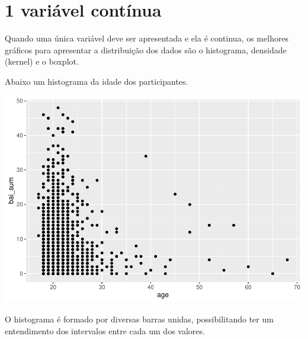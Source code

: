 \documentclass[
]{book}
\newenvironment{Shaded}{\begin{snugshade}}{\end{snugshade}}
\newcommand{\DataTypeTok}[1]{\textcolor[rgb]{0.13,0.29,0.53}{#1}}
\newcommand{\DecValTok}[1]{\textcolor[rgb]{0.00,0.00,0.81}{#1}}
\newcommand{\KeywordTok}[1]{\textcolor[rgb]{0.13,0.29,0.53}{\textbf{#1}}}
\newcommand{\NormalTok}[1]{#1}
\newcommand{\OperatorTok}[1]{\textcolor[rgb]{0.81,0.36,0.00}{\textbf{#1}}}
\newcommand{\StringTok}[1]{\textcolor[rgb]{0.31,0.60,0.02}{#1}}
\begin{document}
\hypertarget{variuxe1vel-contuxednua}{%
\section{1 variável contínua}\label{variuxe1vel-contuxednua}}

Quando uma única variável deve ser apresentada e ela é continua, os
melhores gráficos para apresentar a distribuição dos dados são o
histograma, densidade (kernel) e o boxplot.

Abaixo um histograma da idade dos participantes.

\begin{Shaded}
\end{Shaded}

\begin{center}\includegraphics{gitbook-demo_files/figure-latex/unnamed-chunk-22-1} \end{center}

O histograma é formado por diversas barras unidas, possibilitando ter um
entendimento dos intervalos entre cada um dos valores.
\end{document}
